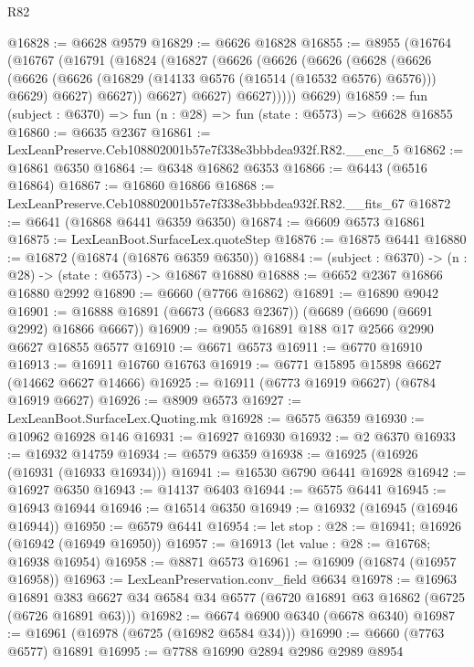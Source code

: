 \begin{lexlean}{R82}
\begin{coremodule}
@16828 := @6628 @9579
@16829 := @6626 @16828
@16855 := @8955
    (@16764
      (@16767
        (@16791
          (@16824
            (@16827
              (@6626
                (@6626
                  (@6626
                    (@6628
                      (@6626
                        (@6626
                          (@6626 (@16829 (@14133 @6576 (@16514 (@16532 @6576) @6576))) @6629)
                          @6627)
                        @6627))
                    @6627)
                  @6627)
                @6627)))))
      @6629)
@16859 := fun (subject : @6370) => fun (n : @28) => fun (state : @6573) => @6628 @16855
@16860 := @6635 @2367
@16861 := LexLeanPreserve.Ceb108802001b57e7f338e3bbbdea932f.R82.__enc_5
@16862 := @16861 @6350
@16864 := @6348 @16862 @6353
@16866 := @6443 (@6516 @16864)
@16867 := @16860 @16866
@16868 := LexLeanPreserve.Ceb108802001b57e7f338e3bbbdea932f.R82.__fits_67
@16872 := @6641 (@16868 @6441 @6359 @6350)
@16874 := @6609 @6573 @16861
@16875 := LexLeanBoot.SurfaceLex.quoteStep
@16876 := @16875 @6441
@16880 := @16872 (@16874 (@16876 @6359 @6350))
@16884 := (subject : @6370) -> (n : @28) -> (state : @6573) -> @16867 @16880
@16888 := @6652 @2367 @16866 @16880 @2992
@16890 := @6660 (@7766 @16862)
@16891 := @16890 @9042
@16901 := @16888 @16891 (@6673 (@6683 @2367)) (@6689 (@6690 (@6691 @2992) @16866 @6667))
@16909 := @9055 @16891 @188 @17 @2566 @2990 @6627 @16855 @6577
@16910 := @6671 @6573
@16911 := @6770 @16910
@16913 := @16911 @16760 @16763
@16919 := @6771 @15895 @15898 @6627 (@14662 @6627 @14666)
@16925 := @16911 (@6773 @16919 @6627) (@6784 @16919 @6627)
@16926 := @8909 @6573
@16927 := LexLeanBoot.SurfaceLex.Quoting.mk
@16928 := @6575 @6359
@16930 := @10962 @16928 @146
@16931 := @16927 @16930
@16932 := @2 @6370
@16933 := @16932 @14759
@16934 := @6579 @6359
@16938 := @16925 (@16926 (@16931 (@16933 @16934)))
@16941 := @16530 @6790 @6441 @16928
@16942 := @16927 @6350
@16943 := @14137 @6403
@16944 := @6575 @6441
@16945 := @16943 @16944
@16946 := @16514 @6350
@16949 := @16932 (@16945 (@16946 @16944))
@16950 := @6579 @6441
@16954 := let stop : @28 := @16941; @16926 (@16942 (@16949 @16950))
@16957 := @16913 (let value : @28 := @16768; @16938 @16954)
@16958 := @8871 @6573
@16961 := @16909 (@16874 (@16957 @16958))
@16963 := LexLeanPreservation.conv_field @6634
@16978 := @16963
    @16891
    @383
    @6627
    @34
    @6584
    @34
    @6577
    (@6720 @16891 @63 @16862 (@6725 (@6726 @16891 @63)))
@16982 := @6674 @6900 @6340 (@6678 @6340)
@16987 := @16961 (@16978 (@6725 (@16982 @6584 @34)))
@16990 := @6660 (@7763 @6577) @16891
@16995 := @7788 @16990 @2894 @2986 @2989 @8954

\end{coremodule}
\end{lexlean}
